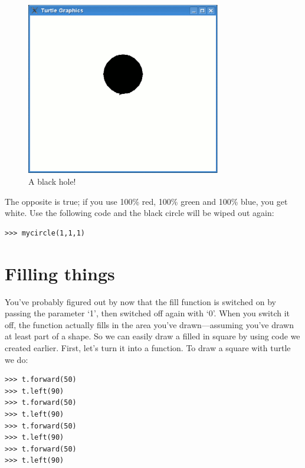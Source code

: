 \begin{figure}
\begin{center}
\includegraphics[width=85mm]{eps/figure25.eps}
\end{center}
\caption{A black hole!}\label{fig25}
\end{figure}

The opposite is true; if you use 100\% red, 100\% green and 100\% blue, you get white.  Use the following code and the black circle will be wiped out again:

\begin{listing}
\begin{verbatim}
>>> mycircle(1,1,1)
\end{verbatim}
\end{listing}

\section{Filling things}

You've probably figured out by now that the fill function is switched on by passing the parameter `1', then switched off again with `0'. When you switch it off, the function actually fills in the area you've drawn---assuming you've drawn at least part of a shape. So we can easily draw a filled in square by using code we created earlier. First, let's turn it into a function. To draw a square with turtle we do:

\begin{listing}
\begin{verbatim}
>>> t.forward(50)
>>> t.left(90)
>>> t.forward(50)
>>> t.left(90)
>>> t.forward(50)
>>> t.left(90)
>>> t.forward(50)
>>> t.left(90)
\end{verbatim}
\end{listing}

